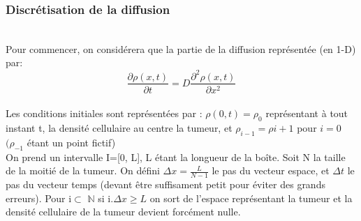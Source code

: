 \documentclass[12pt,a4paper]{article}
\begin{document}
\subsubsection{Discrétisation de la diffusion}  
\\
Pour commencer, on considérera que la partie de la diffusion 
représentée (en 1-D) par: 
\begin{equation}
    \frac{\partial\rho(x,t)}{\partial t} = D\frac{\partial^2
    \rho(x,t)}{\partial x^2}
\end{equation}
\\
Les conditions initiales sont représentées par : 
$\rho(0,t)=\rho_0$ représentant à tout instant t, la densité 
cellulaire au centre la tumeur, et $\rho_{i-1} = \rho{i+1}$ pour $i=0$
$(\rho_{-1}$ étant un point fictif)
\\
On prend un intervalle I=[0,
L], L étant la longueur de la boîte. Soit N la taille de 
la moitié de la tumeur. On défini $\Delta x = \frac{L}{N-1} $ le 
pas du vecteur espace, et $\Delta t$ le pas du vecteur temps 
(devant être suffisament petit pour éviter des grands erreurs). 
Pour i$\subset$ $\mathbb{N}$
si i.$\Delta x \geq L$ on sort de l'espace représentant la 
tumeur et la densité cellulaire de la tumeur devient forcément
nulle.
  
\end{document}
